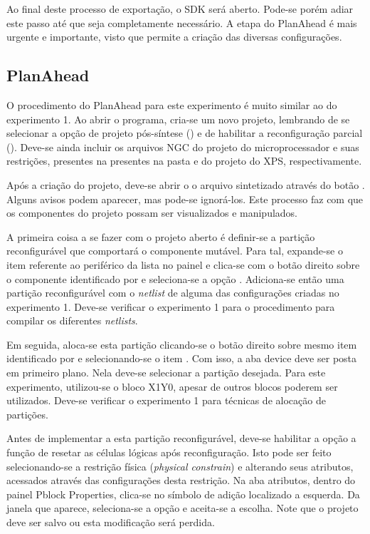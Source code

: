 \documentclass[11pt,a4paper,oneside]{book}
\begin{document}
Ao final deste processo de exportação, o SDK será aberto.
Pode-se porém adiar este passo até que seja completamente necessário.
A etapa do PlanAhead é mais urgente e importante, visto que permite a criação das diversas configurações.

\subsection{PlanAhead}
O procedimento do PlanAhead para este experimento é muito similar ao do experimento 1.
Ao abrir o programa, cria-se um novo projeto, lembrando de se selecionar a opção de projeto pós-síntese () e de habilitar a reconfiguração parcial ().
Deve-se ainda incluir os arquivos NGC do projeto do microprocessador e suas restrições, presentes na presentes na pasta  e  do projeto do XPS, respectivamente.

Após a criação do projeto, deve-se abrir o o arquivo sintetizado através do botão .
Alguns avisos podem aparecer, mas pode-se ignorá-los.
Este processo faz com que os componentes do projeto possam ser visualizados e manipulados.

A primeira coisa a se fazer com o projeto aberto é definir-se a partição reconfigurável que comportará o componente mutável.
Para tal, expande-se o item referente ao periférico da lista no painel  e clica-se com o botão direito sobre o componente identificado por  e seleciona-se a opção .
Adiciona-se então uma partição reconfigurável com o \textit{netlist} de alguma das configurações criadas no experimento 1.
Deve-se verificar o experimento 1 para o procedimento para compilar os diferentes \textit{netlists}.

Em seguida, aloca-se esta partição clicando-se o botão direito sobre mesmo item identificado por  e selecionando-se o item .
Com isso, a aba device deve ser posta em primeiro plano.
Nela deve-se selecionar a partição desejada.
Para este experimento, utilizou-se o bloco X1Y0, apesar de outros blocos poderem ser utilizados.
Deve-se verificar o experimento 1 para técnicas de alocação de partições.

Antes de implementar a esta partição reconfigurável, deve-se habilitar a opção a função de resetar as células lógicas após reconfiguração.
Isto pode ser feito selecionando-se a restrição física (\textit{physical constrain}) e alterando seus atributos, acessados através das configurações desta restrição.
Na aba atributos, dentro do painel Pblock Properties, clica-se no símbolo de adição localizado a esquerda.
Da janela que aparece, seleciona-se a opção  e aceita-se a escolha.
Note que o projeto deve ser salvo ou esta modificação será perdida.
\end{document}
